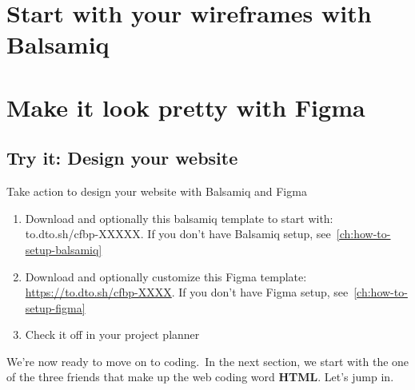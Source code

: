 \section{Start with your wireframes with Balsamiq}\label{sec:start-with-your-wireframes-with-balsamiq}


\section{Make it look pretty with Figma}\label{sec:make-it-look-pretty-with-figma}

\subsection{Try it: Design your website}\label{subsec:design-your-website}
Take action to design your website with Balsamiq and Figma
\begin{enumerate}
    \item Download and optionally this balsamiq template to start with: to.dto.sh/cfbp-XXXXX. If you don't have Balsamiq setup, see~\cref{ch:how-to-setup-balsamiq}
    \item Download and optionally customize this Figma template: \href{https://to.dto.sh/cfbp-XXXX}{https://to.dto.sh/cfbp-XXXX}.
    If you don't have Figma setup, see~\ref{ch:how-to-setup-figma}
    \item Check it off in your project planner
\end{enumerate}

We're now ready to move on to coding.\ In the next section, we start with the one of the three friends that make up the web coding word \textbf{HTML}.
Let's jump in.



